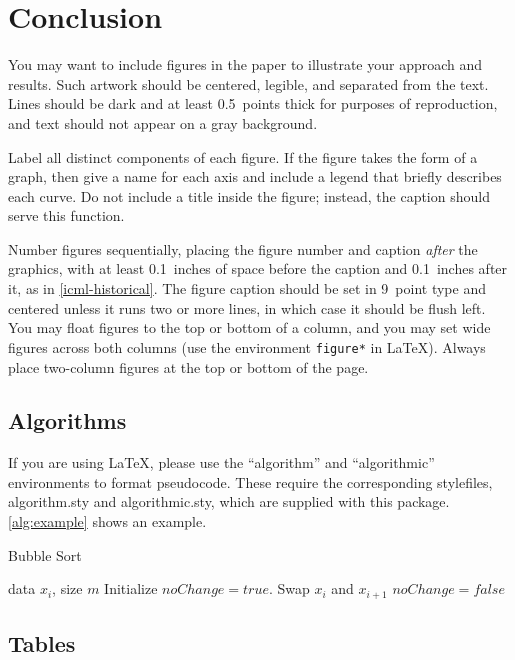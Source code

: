 \documentclass{article}
\theoremstyle{plain}
\theoremstyle{definition}
\theoremstyle{remark}
\begin{document}
\section{Conclusion}

You may want to include figures in the paper to illustrate
your approach and results. Such artwork should be centered,
legible, and separated from the text. Lines should be dark and at
least 0.5~points thick for purposes of reproduction, and text should
not appear on a gray background.

Label all distinct components of each figure. If the figure takes the
form of a graph, then give a name for each axis and include a legend
that briefly describes each curve. Do not include a title inside the
figure; instead, the caption should serve this function.

Number figures sequentially, placing the figure number and caption
\emph{after} the graphics, with at least 0.1~inches of space before
the caption and 0.1~inches after it, as in
\cref{icml-historical}. The figure caption should be set in
9~point type and centered unless it runs two or more lines, in which
case it should be flush left. You may float figures to the top or
bottom of a column, and you may set wide figures across both columns
(use the environment \texttt{figure*} in \LaTeX). Always place
two-column figures at the top or bottom of the page.

\subsection{Algorithms}

If you are using \LaTeX, please use the ``algorithm'' and ``algorithmic''
environments to format pseudocode. These require
the corresponding stylefiles, algorithm.sty and
algorithmic.sty, which are supplied with this package.
\cref{alg:example} shows an example.

\begin{algorithm}[tb]
   \caption{Bubble Sort}
   \label{alg:example}
\begin{algorithmic}
    data $x_i$, size $m$
   \REPEAT
   \STATE Initialize $noChange = true$.
   \STATE Swap $x_i$ and $x_{i+1}$
   \STATE $noChange = false$
   \ENDIF
   \ENDFOR
\end{algorithmic}
\end{algorithm}

\subsection{Tables}
\end{document}
